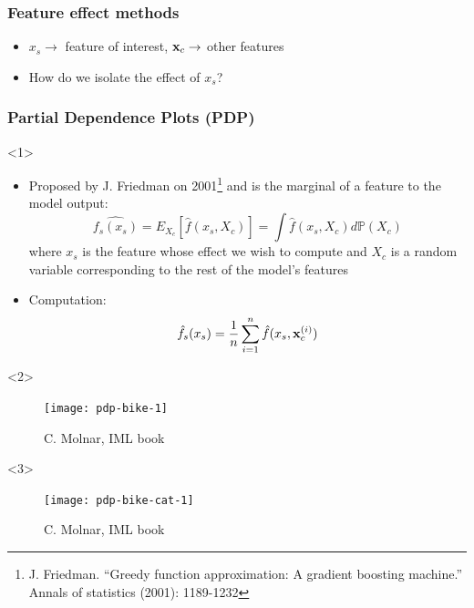 \begin{frame}
  \frametitle{Feature effect methods}
  \begin{itemize}
  \item \(x_s \rightarrow \) feature of interest, \(\mathbf{x}_c \rightarrow\) other features
  \item How do we isolate the effect of \(x_s\)?
  \end{itemize}
\end{frame}

\begin{frame}
  \frametitle{Partial Dependence Plots (PDP)}
  \begin{onlyenv}<1>
    \begin{itemize}
    \item Proposed by J. Friedman on 2001\footnote{J. Friedman. ``Greedy
    function approximation: A gradient boosting machine.'' Annals of statistics
    (2001): 1189-1232} and is the marginal  of a feature to the
      model output:
      \begin{equation*}
        \hat{f_s(x_s)} = E_{X_c}\left[\hat{f}(x_s, X_c)\right] =
        \int\hat{f}(x_s, X_c)d\mathbb{P}(X_c)
      \end{equation*}
      where $x_s$ is the feature whose effect we wish to compute and $X_c$ is a
      random variable corresponding to the rest of the model's features
    \item Computation:
      \begin{equation*}
        \hat{f}_s(x_s) = \frac{1}{n}\sum\limits_{i=1}^{n}\hat{f}(x_s, \mathbf{x}_c^{(i)})
      \end{equation*}
    \end{itemize}
  \end{onlyenv}
  \begin{onlyenv}<2>
    \begin{figure}
      \texttt{[image: pdp-bike-1]}
      \caption{\footnotesize C. Molnar, IML book}
    \end{figure}
  \end{onlyenv}
  \begin{onlyenv}<3>
    \begin{figure}
      \texttt{[image: pdp-bike-cat-1]}
      \caption{\footnotesize C. Molnar, IML book}
    \end{figure}
  \end{onlyenv}
\end{frame}

